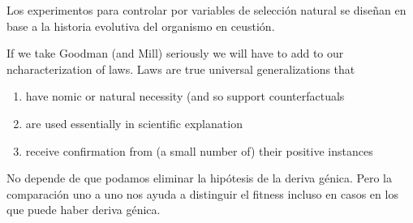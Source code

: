 Los experimentos para controlar por variables de selección natural se diseñan en base a la historia evolutiva del organismo en ceustión.


If we take Goodman (and Mill) seriously we will have to add to our ncharacterization of laws. Laws are true universal generalizations that

\begin{enumerate}
  \item have nomic or natural necessity (and so support counterfactuals
  \item are used essentially in scientific explanation
  \item receive confirmation from (a small number of) their positive instances
  \end{enumerate}

No depende de que podamos eliminar la hipótesis de la deriva génica. Pero la comparación uno a uno nos ayuda a distinguir el fitness incluso en casos en los que puede haber deriva génica.
